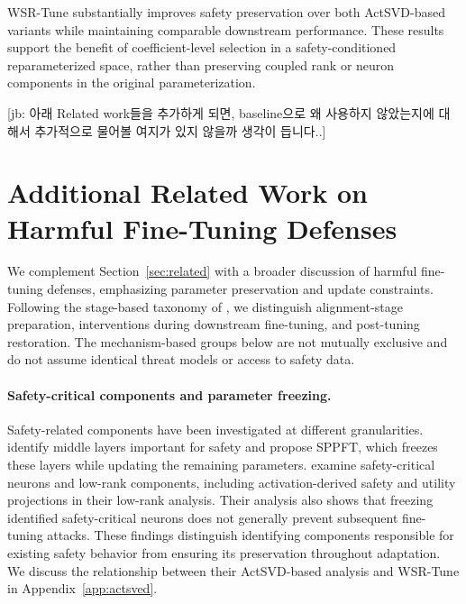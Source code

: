 \documentclass{article}
\newcommand{\wjb}[1]{{\leavevmode\color{orange}[jb: #1]}}
\begin{document}
WSR-Tune substantially improves safety preservation over both ActSVD-based variants while maintaining comparable downstream performance. These results support the benefit of coefficient-level selection in a safety-conditioned reparameterized space, rather than preserving coupled rank or neuron components in the original parameterization.






\wjb{아래 Related work들을 추가하게 되면, baseline으로 왜 사용하지 않았는지에 대해서 추가적으로 물어볼 여지가 있지 않을까 생각이 듭니다..}

\section{Additional Related Work on Harmful Fine-Tuning Defenses}
\label{app:additional_related_work}

We complement Section~\ref{sec:related} with a broader discussion of harmful fine-tuning defenses, emphasizing parameter preservation and update constraints. Following the stage-based taxonomy of \citet{huang2024harmful}, we distinguish alignment-stage preparation, interventions during downstream fine-tuning, and post-tuning restoration. The mechanism-based groups below are not mutually exclusive and do not assume identical threat models or access to safety data.

\paragraph{Safety-critical components and parameter freezing.} Safety-related components have been investigated at different granularities. \citet{li2025safety} identify middle layers important for safety and propose SPPFT, which freezes these layers while updating the remaining parameters. \citet{assessing_the_brittleness} examine safety-critical neurons and low-rank components, including activation-derived safety and utility projections in their low-rank analysis. Their analysis also shows that freezing identified safety-critical neurons does not generally prevent subsequent fine-tuning attacks. These findings distinguish identifying components responsible for existing safety behavior from ensuring its preservation throughout adaptation. We discuss the relationship between their ActSVD-based analysis and WSR-Tune in Appendix~\ref{app:actsved}.
\end{document}
